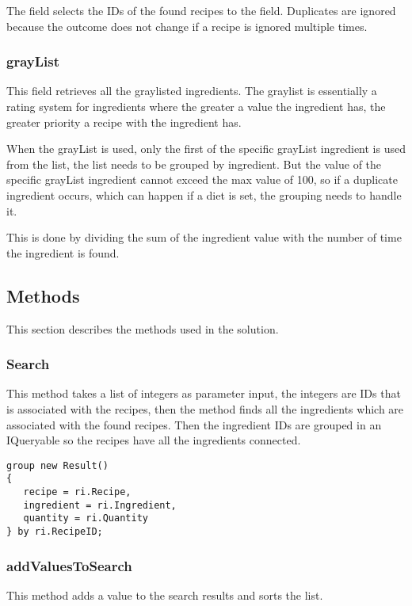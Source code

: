 The field selects the IDs of the found recipes to the field. Duplicates are ignored because the outcome does not change if a recipe is ignored multiple times.

\subsubsection{grayList}\label{ssc:graylist}
This field retrieves all the graylisted ingredients. The graylist is essentially a rating system for ingredients where the greater a value the ingredient has, the greater priority a recipe with the ingredient has.

When the grayList is used, only the first of the specific grayList ingredient is used from the list, the list needs to be grouped by ingredient. But the value of the specific grayList ingredient cannot exceed the max value of 100, so if a duplicate ingredient occurs, which can happen if a diet is set, the grouping needs to handle it. 

This is done by dividing the sum of the ingredient value with the number of time the ingredient is found. 

\subsection{Methods}
This section describes the methods used in the solution.
\subsubsection{Search}
This method takes a list of integers as parameter input, the integers are IDs that is associated with the recipes, then the method finds all the ingredients which are associated with the found recipes. Then the ingredient IDs are grouped in an IQueryable so the recipes have all the ingredients connected.

\begin{lstlisting}[caption=ResultGrouping, label={lst:ResultGrouping}, language=CSharp]
group new Result()
{
   recipe = ri.Recipe,
   ingredient = ri.Ingredient,
   quantity = ri.Quantity
} by ri.RecipeID;
\end{lstlisting}

\subsubsection{addValuesToSearch}
This method adds a value to the search results and sorts the list.

